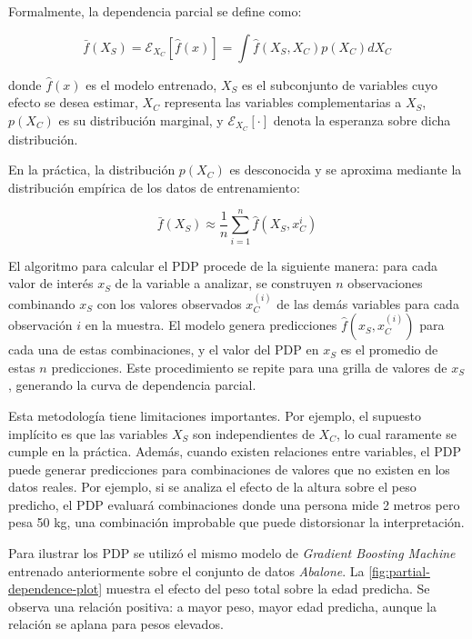 Formalmente, la dependencia parcial se define como:

\begin{equation}
    \label{eq:pdp}
\bar{f}(X_S)=\mathcal{E}_{X_C}[\hat{f}(x)]=\int \hat{f}(X_S,X_C)p(X_C)dX_C    
\end{equation}

donde $\hat{f}(x)$ es el modelo entrenado, $X_S$ es el subconjunto de variables cuyo efecto se desea estimar, $X_C$ representa las variables complementarias a $X_S$, $p(X_C)$ es su distribución marginal, y $\mathcal{E}_{X_C}[\cdot]$ denota la esperanza sobre dicha distribución.

En la práctica, la distribución $p(X_C)$ es desconocida y se aproxima mediante la distribución empírica de los datos de entrenamiento:
 
\begin{equation}
\bar{f}(X_S)\approx\frac{1}{n}\sum_{i=1}^{n}\hat{f}(X_S,x_{C}^{i})
\end{equation}

El algoritmo para calcular el PDP procede de la siguiente manera: para cada valor de interés $x_S$ de la variable a analizar, se construyen $n$ observaciones combinando $x_S$ con los valores observados $x_C^{(i)}$ de las demás variables para cada observación $i$ en la muestra. El modelo genera predicciones $\hat{f}(x_S, x_C^{(i)})$ para cada una de estas combinaciones, y el valor del PDP en $x_S$ es el promedio de estas $n$ predicciones. Este procedimiento se repite para una grilla de valores de $x_S$, generando la curva de dependencia parcial.

Esta metodología tiene limitaciones importantes. Por ejemplo, el supuesto implícito es que las variables $X_S$ son independientes de $X_C$, lo cual raramente se cumple en la práctica. Además, cuando existen relaciones entre variables, el PDP puede generar predicciones para combinaciones de valores que no existen en los datos reales. Por ejemplo, si se analiza el efecto de la altura sobre el peso predicho, el PDP evaluará combinaciones donde una persona mide 2 metros pero pesa 50 kg, una combinación improbable que puede distorsionar la interpretación.

Para ilustrar los PDP se utilizó el mismo modelo de \textit{Gradient Boosting Machine} entrenado anteriormente sobre el conjunto de datos \textit{Abalone}. La \autoref{fig:partial-dependence-plot} muestra el efecto del peso total sobre la edad predicha. Se observa una relación positiva: a mayor peso, mayor edad predicha, aunque la relación se aplana para pesos elevados.

